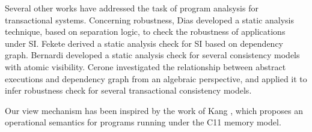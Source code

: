 Several other works have addressed the task of program analsysis for transactional systems. 
Concerning robustness, 
Dias \etal \cite{dias-tm} developed a static analysis technique, based on separation logic, 
to check the robustness of applications under SI. Fekete \etal \cite{fekete-tods} derived 
a static analysis check for SI based on dependency graph. Bernardi \etal \cite{giovanni-concur16} 
developed a static analysis check for several consistency models with atomic visibility. 
Cerone \etal \cite{laws} investigated the relationship between abstract 
executions and dependency graph from an algebraic perspective, and applied it to infer 
robustness check for several transactional consistency models. 


Our view mechanism has been inspired by the work of Kang \etal \cite{promises}, 
which proposes an operational semantics for programs running under the C11 memory model.